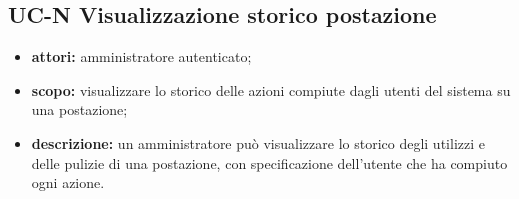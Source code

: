 \subsection{UC-N Visualizzazione storico postazione}
\begin{itemize}
    \item \textbf{attori:} amministratore autenticato;
    \item \textbf{scopo:} visualizzare lo storico delle azioni compiute dagli utenti del sistema su una postazione;
    \item \textbf{descrizione:} un amministratore pu\`{o} visualizzare lo storico degli utilizzi e delle pulizie di una postazione, con specificazione dell'utente che ha compiuto ogni azione.
\end{itemize}
